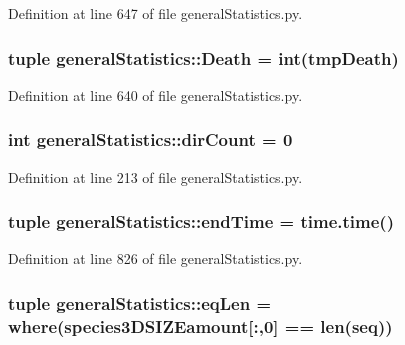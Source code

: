 \-Definition at line 647 of file general\-Statistics.\-py.

\hypertarget{namespacegeneral_statistics_adf189f2548701e50989d743b810b998d}{
\subsubsection[{\-Death}]{\setlength{\rightskip}{0pt plus 5cm}tuple {\bf general\-Statistics\-::\-Death} = int(tmp\-Death)}}\label{namespacegeneral_statistics_adf189f2548701e50989d743b810b998d}


\-Definition at line 640 of file general\-Statistics.\-py.

\hypertarget{namespacegeneral_statistics_a5193f44043d24342fab95fb5d704a20f}{
\subsubsection[{dir\-Count}]{\setlength{\rightskip}{0pt plus 5cm}int {\bf general\-Statistics\-::dir\-Count} = 0}}\label{namespacegeneral_statistics_a5193f44043d24342fab95fb5d704a20f}


\-Definition at line 213 of file general\-Statistics.\-py.

\hypertarget{namespacegeneral_statistics_aeb767013d3dae060634c685e388ffd5c}{
\subsubsection[{end\-Time}]{\setlength{\rightskip}{0pt plus 5cm}tuple {\bf general\-Statistics\-::end\-Time} = time.\-time()}}\label{namespacegeneral_statistics_aeb767013d3dae060634c685e388ffd5c}


\-Definition at line 826 of file general\-Statistics.\-py.

\hypertarget{namespacegeneral_statistics_ad6743c4b3941567c5169875b866b00ea}{
\subsubsection[{eq\-Len}]{\setlength{\rightskip}{0pt plus 5cm}tuple {\bf general\-Statistics\-::eq\-Len} = where({\bf species3\-D\-S\-I\-Z\-Eamount}\mbox{[}\-:,0\mbox{]} == len(seq))}}\label{namespacegeneral_statistics_ad6743c4b3941567c5169875b866b00ea}


